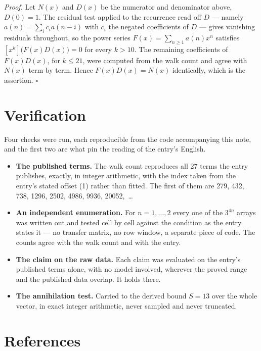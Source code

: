 \documentclass[11pt]{article}
\theoremstyle{definition}
\begin{document}
{\itshape Proof.} Let $N(x)$ and $D(x)$ be the numerator and denominator above, $D(0)=1$. The residual test applied to the recurrence read off $D$ --- namely $a(n) = \sum_i c_i a(n-i)$ with $c_i$ the negated coefficients of $D$ --- gives vanishing residuals throughout, so the power series $F(x)=\sum_{n\ge 1}a(n)x^n$ satisfies $[x^k]\bigl(F(x)D(x)\bigr) = 0$ for every $k > 10$. The remaining coefficients of $F(x)D(x)$, for $k \le 21$, were computed from the walk count and agree with $N(x)$ term by term. Hence $F(x)D(x) = N(x)$ identically, which is the assertion. $\square$

\section{Verification}

Four checks were run, each reproducible from the code accompanying this note, and the first two are what pin the reading of the entry's English.

\begin{itemize}

\item {\bfseries The published terms.} The walk count reproduces all 27 terms the entry publishes, exactly, in integer arithmetic, with the index taken from the entry's stated offset (1) rather than fitted. The first of them are 279, 432, 738, 1296, 2502, 4986, 9936, 20052,~\dots

\item {\bfseries An independent enumeration.} For $n = 1,\dots,2$ every one of the $3^{4n}$ arrays was written out and tested cell by cell against the condition as the entry states it --- no transfer matrix, no row window, a separate piece of code. The counts agree with the walk count and with the entry.

\item {\bfseries The claim on the raw data.} Each claim was evaluated on the entry's published terms alone, with no model involved, wherever the proved range and the published data overlap. It holds there.

\item {\bfseries The annihilation test.} Carried to the derived bound $S = 13$ over the whole vector, in exact integer arithmetic, never sampled and never truncated.

\end{itemize}

\section{References}
\end{document}
